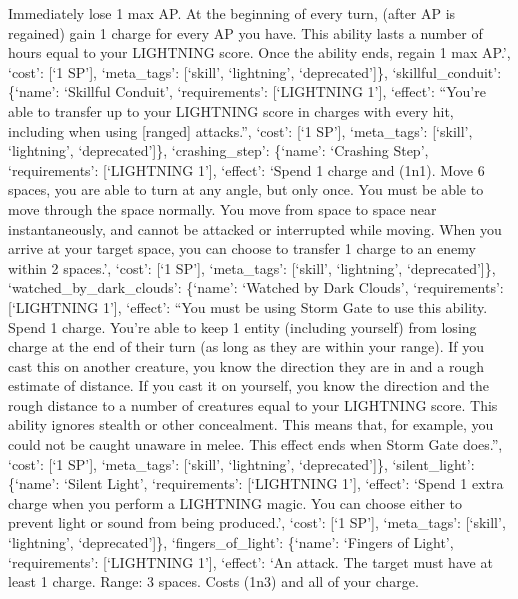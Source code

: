 \documentclass[
  letterpaper,
  DIV=11,
  numbers=noendperiod]{scrartcl}
\begin{document}
Immediately lose 1 max AP. At the beginning of every turn, (after AP is
regained) gain 1 charge for every AP you have. This ability lasts a
number of hours equal to your LIGHTNING score. Once the ability ends,
regain 1 max AP.', `cost': {[}`1 SP'{]}, `meta\_tags': {[}`skill',
`lightning', `deprecated'{]}\}, `skillful\_conduit': \{`name': `Skillful
Conduit', `requirements': {[}`LIGHTNING 1'{]}, `effect': ``You're able
to transfer up to your LIGHTNING score in charges with every hit,
including when using {[}ranged{]} attacks.'', `cost': {[}`1 SP'{]},
`meta\_tags': {[}`skill', `lightning', `deprecated'{]}\},
`crashing\_step': \{`name': `Crashing Step', `requirements':
{[}`LIGHTNING 1'{]}, `effect': `Spend 1 charge and (1n1). Move 6 spaces,
you are able to turn at any angle, but only once. You must be able to
move through the space normally. You move from space to space near
instantaneously, and cannot be attacked or interrupted while moving.
When you arrive at your target space, you can choose to transfer 1
charge to an enemy within 2 spaces.', `cost': {[}`1 SP'{]},
`meta\_tags': {[}`skill', `lightning', `deprecated'{]}\},
`watched\_by\_dark\_clouds': \{`name': `Watched by Dark Clouds',
`requirements': {[}`LIGHTNING 1'{]}, `effect': ``You must be using Storm
Gate to use this ability. Spend 1 charge. You're able to keep 1 entity
(including yourself) from losing charge at the end of their turn (as
long as they are within your range). If you cast this on another
creature, you know the direction they are in and a rough estimate of
distance. If you cast it on yourself, you know the direction and the
rough distance to a number of creatures equal to your LIGHTNING score.
This ability ignores stealth or other concealment. This means that, for
example, you could not be caught unaware in melee. This effect ends when
Storm Gate does.'', `cost': {[}`1 SP'{]}, `meta\_tags': {[}`skill',
`lightning', `deprecated'{]}\}, `silent\_light': \{`name': `Silent
Light', `requirements': {[}`LIGHTNING 1'{]}, `effect': `Spend 1 extra
charge when you perform a LIGHTNING magic. You can choose either to
prevent light or sound from being produced.', `cost': {[}`1 SP'{]},
`meta\_tags': {[}`skill', `lightning', `deprecated'{]}\},
`fingers\_of\_light': \{`name': `Fingers of Light', `requirements':
{[}`LIGHTNING 1'{]}, `effect': `An attack. The target must have at least
1 charge. Range: 3 spaces. Costs (1n3) and all of your charge.
\end{document}
